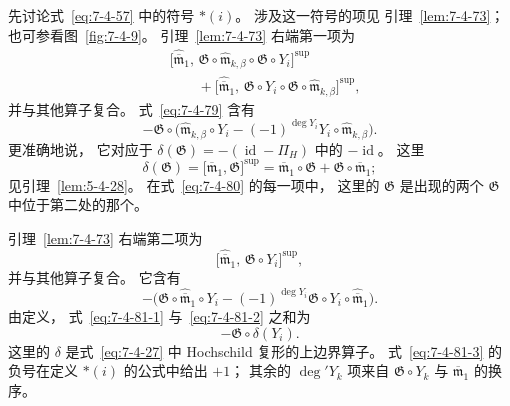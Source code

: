 
先讨论式~\eqref{eq:7-4-57}
中的符号 $*(i)$。
涉及这一符号的项见
引理~\ref{lem:7-4-73}；
也可参看图~\ref{fig:7-4-9}。
引理~\ref{lem:7-4-73}
右端第一项为
\begin{equation}
\begin{aligned}
&\bigl[
\widehat{\overline{\mathfrak m}}_1,\,
\mathfrak G\circ
\widehat{\mathfrak m}_{k,\beta}
\circ\mathfrak G\circ Y_i
\bigr]^{\mathrm{sup}}\\
&\qquad+
\bigl[
\widehat{\overline{\mathfrak m}}_1,\,
\mathfrak G\circ Y_i\circ
\mathfrak G\circ
\widehat{\mathfrak m}_{k,\beta}
\bigr]^{\mathrm{sup}},
\end{aligned}
\tag{7.4.80}\label{eq:7-4-80}
\end{equation}
并与其他算子复合。
式~\eqref{eq:7-4-79}
含有
\begin{equation}
-\mathfrak G\circ
\bigl(
\widehat{\mathfrak m}_{k,\beta}\circ Y_i
-(-1)^{\deg Y_i}
Y_i\circ
\widehat{\mathfrak m}_{k,\beta}
\bigr).
\tag{7.4.81.1}\label{eq:7-4-81-1}
\end{equation}
更准确地说，
它对应于
$\delta(\mathfrak G)
=-(\operatorname{id}-\Pi_H)$
中的 $-\operatorname{id}$。
这里
\[
\delta(\mathfrak G)
=\bigl[
\overline{\mathfrak m}_1,
\mathfrak G
\bigr]^{\mathrm{sup}}
=\overline{\mathfrak m}_1\circ\mathfrak G
+\mathfrak G\circ\overline{\mathfrak m}_1;
\]
见引理~\ref{lem:5-4-28}。
在式~\eqref{eq:7-4-80}
的每一项中，
这里的 $\mathfrak G$
是出现的两个
$\mathfrak G$ 中位于第二处的那个。

引理~\ref{lem:7-4-73}
右端第二项为
\[
\bigl[
\widehat{\overline{\mathfrak m}}_1,\,
\mathfrak G\circ Y_i
\bigr]^{\mathrm{sup}},
\]
并与其他算子复合。
它含有
\begin{equation}
-\bigl(
\mathfrak G\circ
\widehat{\overline{\mathfrak m}}_1\circ Y_i
-(-1)^{\deg Y_i}
\mathfrak G\circ Y_i\circ
\widehat{\overline{\mathfrak m}}_1
\bigr).
\tag{7.4.81.2}\label{eq:7-4-81-2}
\end{equation}
由定义，
式~\eqref{eq:7-4-81-1}
与~\eqref{eq:7-4-81-2}
之和为
\begin{equation}
-\mathfrak G\circ\delta(Y_i).
\tag{7.4.81.3}\label{eq:7-4-81-3}
\end{equation}
这里的 $\delta$
是式~\eqref{eq:7-4-27}
中 Hochschild 复形的上边界算子。
式~\eqref{eq:7-4-81-3}
的负号在定义 $*(i)$
的公式中给出 $+1$；
其余的
$\deg'Y_k$ 项来自
$\mathfrak G\circ Y_k$
与 $\overline{\mathfrak m}_1$
的换序。

